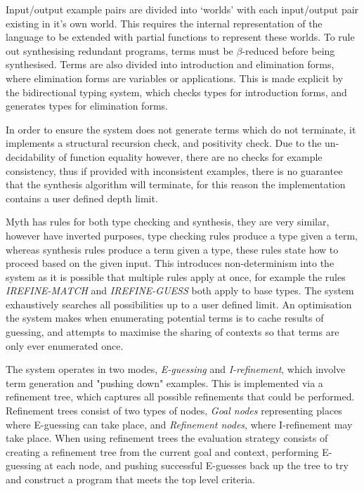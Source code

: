 \documentclass[a4paper]{article}
\begin{document}
Input/output example pairs are divided into `worlds' with each input/output pair existing in it's own world. This requires the internal representation 
of the language to be extended with partial functions to represent these worlds. 
To rule out synthesising redundant programs, terms must be \(\beta\)-reduced before being synthesised. Terms are also divided into introduction 
and elimination forms, where elimination forms are variables or applications. This is made explicit by the bidirectional typing system, 
which checks types for introduction forms, and generates types for elimination forms.

In order to ensure the system does not generate terms which do not terminate, it implements a structural recursion check, and positivity check.
Due to the un-decidability of function equality however, there are no checks for example consistency, thus if provided with inconsistent examples, there
is no guarantee that the synthesis algorithm will terminate, for this reason the implementation contains a user defined depth limit. 

Myth has rules for both type checking and synthesis, they are very similar, however have inverted purposes, type checking rules produce a 
type given a term, whereas synthesis rules produce a term given a type, these rules state how to proceed based on the given input. This introduces
non-determinism into the system as it is possible that multiple rules apply at once, for example the rules \emph{IREFINE-MATCH} and \emph{IREFINE-GUESS} both 
apply to base types. The system exhaustively searches all possibilities up to a user defined limit. An optimisation the system makes when enumerating potential 
terms is to cache results of guessing, and attempts to maximise the sharing of contexts so that terms are only ever enumerated once. 

The system operates in two modes, \emph{E-guessing} and \emph{I-refinement}, which involve term generation and "pushing down" examples. This is implemented via a 
refinement tree, which captures all possible refinements that could be performed. Refinement trees consist of two types of nodes, \emph{Goal nodes} representing 
places where E-guessing can take place, and \emph{Refinement nodes}, where I-refinement may take place. When using refinement 
trees the evaluation strategy consists of creating a refinement tree from the current goal and context, performing E-guessing at 
each node, and pushing successful E-guesses back up the tree to try and construct a program that meets the top level criteria. 
\end{document}
